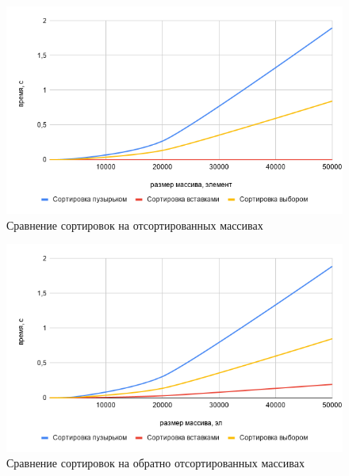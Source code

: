 \documentclass[a4paper,12pt]{article}
\begin{document}
	\begin{center}
	\begin{figure}[H]	
	{
		\centering
      	\includegraphics[scale=0.7]{chart.png}
        \caption{Сравнение сортировок на отсортированных массивах}
        \label{ris:cmp_mtrx}
    }
    \end{figure}
        		
	\begin{figure}[H]	
    {
    	\centering
    	\includegraphics[scale=0.7]{chart1.png}
    	\caption{\label{ris:cmp_r_and_m}Сравнение сортировок на обратно отсортированных массивах}        					
    }
    \end{figure}
    

\end{center}
\end{document}
